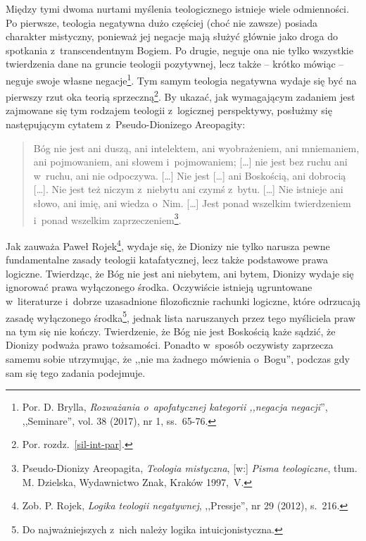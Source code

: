 Między tymi dwoma nurtami myślenia teologicznego istnieje wiele odmienności. Po pierwsze, teologia negatywna dużo częściej (choć nie zawsze) posiada charakter mistyczny, ponieważ jej negacje mają służyć głównie jako droga do spotkania z~transcendentnym Bogiem. Po drugie, neguje ona nie tylko wszystkie twierdzenia dane na gruncie teologii pozytywnej, lecz także -- krótko mówiąc -- neguje swoje własne negacje\footnote{Por. D. Brylla, \textit{Rozważania o~apofatycznej kategorii ,,negacja negacji}'', ,,Seminare'', vol. 38 (2017), nr 1, ss.~65-76.}. Tym samym teologia negatywna wydaje się być na pierwszy rzut oka teorią sprzeczną\footnote{Por. rozdz.~\ref{sil-int-par}.}. By ukazać, jak wymagającym zadaniem jest zajmowane się tym rodzajem teologii z~logicznej perspektywy, posłużmy się następującym cytatem z~Pseudo-Dionizego Areopagity:

\begin{quote}
Bóg nie jest ani duszą, ani intelektem, ani wyobrażeniem, ani mniemaniem, ani pojmowaniem, ani słowem i~pojmowaniem; [\ldots] nie jest bez ruchu ani w~ruchu, ani nie odpoczywa. [\ldots] Nie jest [\ldots] ani Boskością, ani dobrocią [\ldots]. Nie jest też niczym z~niebytu ani czymś z~bytu. [\ldots] Nie istnieje ani słowo, ani imię, ani wiedza o~Nim. [\ldots] Jest ponad wszelkim twierdzeniem i~ponad wszelkim zaprzeczeniem\footnote{Pseudo-Dionizy Areopagita, \textit{Teologia mistyczna}, [w:] \textit{Pisma teologiczne}, tłum. M. Dzielska, Wydawnictwo Znak, Kraków 1997,~V.}.
\end{quote}

Jak zauważa Paweł Rojek\footnote{Zob. P. Rojek, \textit{Logika teologii negatywnej}, ,,Pressje'', nr 29 (2012), s.~216.}, wydaje się, że Dionizy nie tylko narusza pewne fundamentalne zasady teologii katafatycznej, lecz także podstawowe prawa logiczne. Twierdząc, że Bóg nie jest ani niebytem, ani bytem, Dionizy wydaje się ignorować prawa wyłączonego środka. Oczywiście istnieją ugruntowane w~literaturze i~dobrze uzasadnione filozoficznie rachunki logiczne, które odrzucają zasadę wyłączonego środka\footnote{Do najważniejszych z~nich należy logika intuicjonistyczna.}, jednak lista naruszanych przez tego myśliciela praw na tym się nie kończy. Twierdzenie, że Bóg nie jest Boskością każe sądzić, że Dionizy podważa prawo tożsamości. Ponadto w~sposób oczywisty zaprzecza samemu sobie utrzymując, że ,,nie ma żadnego mówienia o~Bogu'', podczas gdy sam się tego zadania podejmuje.

